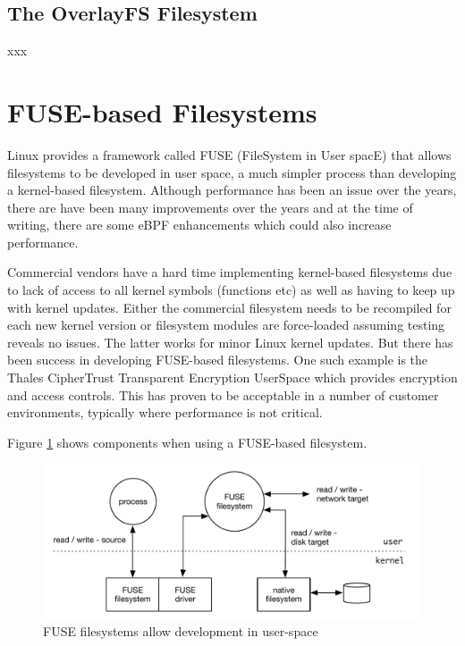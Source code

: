 
\subsection{The OverlayFS Filesystem}

xxx


\section{FUSE-based Filesystems}

Linux provides a framework called FUSE (FileSystem in User spacE) that allows filesystems to be developed in user space, a much simpler process than developing a kernel-based filesystem. Although performance has been an issue over the years, there are have been many improvements over the years and at the time of writing, there are some eBPF enhancements which could also increase performance. 

Commercial vendors have a hard time implementing kernel-based filesystems due to lack of access to all kernel symbols (functions etc) as well as having to keep up with kernel updates. Either the commercial filesystem needs to be recompiled for each new kernel version or filesystem modules are force-loaded assuming testing reveals no issues. The latter works for minor Linux kernel updates. But there has been success in developing FUSE-based filesystems. One such example is the Thales CipherTrust Transparent Encryption UserSpace which provides encryption and access controls. This has proven to be acceptable in a number of customer environments, typically where performance is not critical.

Figure \ref{fig:fuse-fs-chap} shows components when using a FUSE-based filesystem.

\begin{figure}
	\includegraphics[scale=0.6]{figures/fuse-fs-chap.pdf}
	\centering
	\caption{FUSE filesystems allow development in user-space}
	\label{fig:fuse-fs-chap}
\end{figure}

